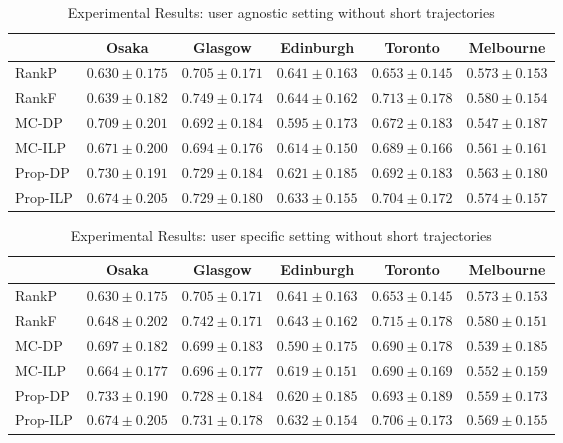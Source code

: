 \begin{table*}
\centering
\caption{Experimental Results: user agnostic setting without short trajectories}
\begin{tabular}{l|ccccc} \hline
 & Osaka & Glasgow & Edinburgh & Toronto & Melbourne \\ \hline
RankP & $0.630\pm0.175$ & $0.705\pm0.171$ & $0.641\pm0.163$ & $0.653\pm0.145$ & $0.573\pm0.153$ \\
RankF & $0.639\pm0.182$ & $\mathbf{0.749\pm0.174}$ & $\mathbf{0.644\pm0.162}$ & $\mathbf{0.713\pm0.178}$ & $\mathbf{0.580\pm0.154}$ \\
MC-DP & $0.709\pm0.201$ & $0.692\pm0.184$ & $0.595\pm0.173$ & $0.672\pm0.183$ & $0.547\pm0.187$ \\
MC-ILP & $0.671\pm0.200$ & $0.694\pm0.176$ & $0.614\pm0.150$ & $0.689\pm0.166$ & $0.561\pm0.161$ \\
Prop-DP & $\mathbf{0.730\pm0.191}$ & $0.729\pm0.184$ & $0.621\pm0.185$ & $0.692\pm0.183$ & $0.563\pm0.180$ \\
Prop-ILP & $0.674\pm0.205$ & $0.729\pm0.180$ & $0.633\pm0.155$ & $0.704\pm0.172$ & $0.574\pm0.157$ \\
\hline
\end{tabular}
\end{table*}

\begin{table*}
\centering
\caption{Experimental Results: user specific setting without short trajectories}
\begin{tabular}{l|ccccc} \hline
 & Osaka & Glasgow & Edinburgh & Toronto & Melbourne \\ \hline
RankP & $0.630\pm0.175$ & $0.705\pm0.171$ & $0.641\pm0.163$ & $0.653\pm0.145$ & $0.573\pm0.153$ \\
RankF & $0.648\pm0.202$ & $\mathbf{0.742\pm0.171}$ & $\mathbf{0.643\pm0.162}$ & $\mathbf{0.715\pm0.178}$ & $\mathbf{0.580\pm0.151}$ \\
MC-DP & $0.697\pm0.182$ & $0.699\pm0.183$ & $0.590\pm0.175$ & $0.690\pm0.178$ & $0.539\pm0.185$ \\
MC-ILP & $0.664\pm0.177$ & $0.696\pm0.177$ & $0.619\pm0.151$ & $0.690\pm0.169$ & $0.552\pm0.159$ \\
Prop-DP & $\mathbf{0.733\pm0.190}$ & $0.728\pm0.184$ & $0.620\pm0.185$ & $0.693\pm0.189$ & $0.559\pm0.173$ \\
Prop-ILP & $0.674\pm0.205$ & $0.731\pm0.178$ & $0.632\pm0.154$ & $0.706\pm0.173$ & $0.569\pm0.155$ \\
\hline
\end{tabular}
\end{table*}

